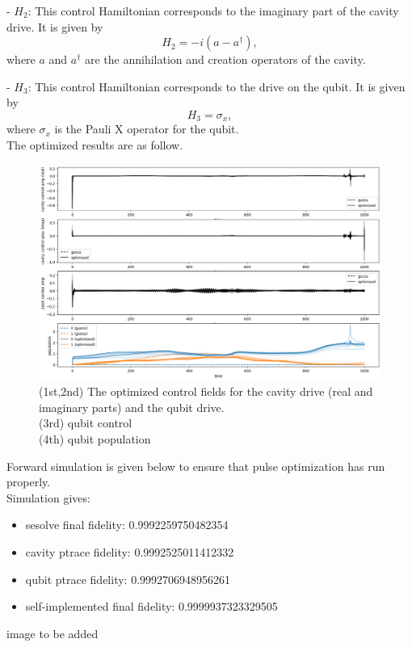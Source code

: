\documentclass[12pt]{article}
\begin{document}
   - $H_2$: This control Hamiltonian corresponds to the imaginary part of the cavity drive. It is given by
     \begin{equation}
     H_2 = -i\left(a - a^\dagger\right),
     \end{equation}
     where $a$ and $a^\dagger$ are the annihilation and creation operators of the cavity.

   - $H_3$: This control Hamiltonian corresponds to the drive on the qubit. It is given by
     \begin{equation}
     H_3 = \sigma_x,
     \end{equation}
     where $\sigma_x$ is the Pauli X operator for the qubit.
\\
The optimized results are as follow. 
\begin{figure}[H]
    \centering
    \includegraphics[width=0.95\linewidth]{vac2cat_krotov.png}
    \caption{
        (1st,2nd) The optimized control fields for the cavity drive (real and imaginary parts) and the qubit drive. \\
        (3rd) qubit control \\
        (4th) qubit population
    }
    \label{fig:vac2cat_krotov}
\end{figure}

Forward simulation is given below to ensure that pulse optimization has run properly. 
\\
Simulation gives: 
\begin{itemize}
    \item sesolve final fidelity:  0.9992259750482354
    \item cavity ptrace fidelity:  0.9992525011412332
    \item qubit ptrace fidelity:  0.9992706948956261
    \item self-implemented final fidelity:  0.9999937323329505
\end{itemize}
image to be added
\end{document}
